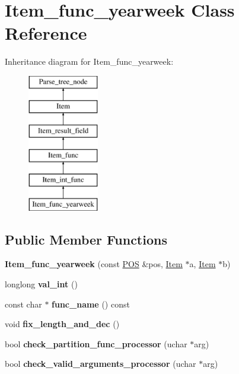 \hypertarget{classItem__func__yearweek}{}\section{Item\+\_\+func\+\_\+yearweek Class Reference}
\label{classItem__func__yearweek}
Inheritance diagram for Item\+\_\+func\+\_\+yearweek\+:\begin{figure}[H]
\begin{center}
\leavevmode
\includegraphics[height=6.000000cm]{classItem__func__yearweek}
\end{center}
\end{figure}
\subsection*{Public Member Functions}
\begin{DoxyCompactItemize}
\item 
\mbox{\label{classItem__func__yearweek_a92b9bf34fa30887ec6fe26071e88ecc3}} 
{\bfseries Item\+\_\+func\+\_\+yearweek} (const \mbox{\hyperlink{structYYLTYPE}{P\+OS}} \&pos, \mbox{\hyperlink{classItem}{Item}} $\ast$a, \mbox{\hyperlink{classItem}{Item}} $\ast$b)
\item 
\mbox{\label{classItem__func__yearweek_ad49c4e9543657ab06cfe1b8b2cc49b67}} 
longlong {\bfseries val\+\_\+int} ()
\item 
\mbox{\label{classItem__func__yearweek_aa6bd9bfe7cfe42f054d18c0bf0e118ff}} 
const char $\ast$ {\bfseries func\+\_\+name} () const
\item 
\mbox{\label{classItem__func__yearweek_a20f060b8cf031cba190e259f3699fcca}} 
void {\bfseries fix\+\_\+length\+\_\+and\+\_\+dec} ()
\item 
\mbox{\label{classItem__func__yearweek_a553e164eca5b22160c5d822c7884ca83}} 
bool {\bfseries check\+\_\+partition\+\_\+func\+\_\+processor} (uchar $\ast$arg)
\item 
\mbox{\label{classItem__func__yearweek_af635ce52c09617ad5a09d4649122b66e}} 
bool {\bfseries check\+\_\+valid\+\_\+arguments\+\_\+processor} (uchar $\ast$arg)
\end{DoxyCompactItemize}
